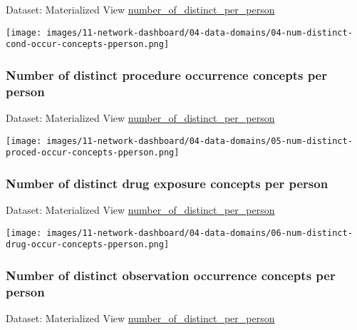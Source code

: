 \documentclass[
]{book}
\begin{document}
Dataset: Materialized View \href{materialized-views-1.html\#number_of_distinct_per_person}{number\_of\_distinct\_per\_person}

\texttt{[image: images/11-network-dashboard/04-data-domains/04-num-distinct-cond-occur-concepts-pperson.png]}

\hypertarget{number-of-distinct-procedure-occurrence-concepts-per-person}{%
\subsubsection*{Number of distinct procedure occurrence concepts per person}\label{number-of-distinct-procedure-occurrence-concepts-per-person}}

Dataset: Materialized View \href{materialized-views-1.html\#number_of_distinct_per_person}{number\_of\_distinct\_per\_person}

\texttt{[image: images/11-network-dashboard/04-data-domains/05-num-distinct-proced-occur-concepts-pperson.png]}

\hypertarget{number-of-distinct-drug-exposure-concepts-per-person}{%
\subsubsection*{Number of distinct drug exposure concepts per person}\label{number-of-distinct-drug-exposure-concepts-per-person}}

Dataset: Materialized View \href{materialized-views-1.html\#number_of_distinct_per_person}{number\_of\_distinct\_per\_person}

\texttt{[image: images/11-network-dashboard/04-data-domains/06-num-distinct-drug-occur-concepts-pperson.png]}

\hypertarget{number-of-distinct-observation-occurrence-concepts-per-person}{%
\subsubsection*{Number of distinct observation occurrence concepts per person}\label{number-of-distinct-observation-occurrence-concepts-per-person}}

Dataset: Materialized View \href{materialized-views-1.html\#number_of_distinct_per_person}{number\_of\_distinct\_per\_person}
\end{document}
